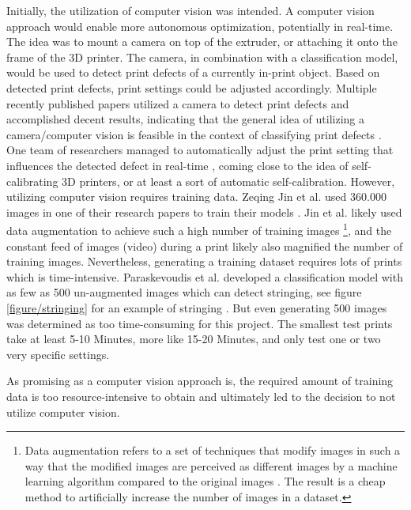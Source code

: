 Initially, the utilization of computer vision was intended. A computer vision approach would enable more autonomous optimization, potentially in real-time. The idea was to mount a camera on top of the extruder, or attaching it onto the frame of the 3D printer. The camera, in combination with a classification model, would be used to detect print defects of a currently in-print object. Based on detected print defects, print settings could be adjusted accordingly. Multiple recently published papers utilized a camera to detect print defects and accomplished decent results, indicating that the general idea of utilizing a camera/computer vision is feasible in the context of classifying print defects \cite{khan2020real, paraskevoudis2020real, jin2020automated, jin2019autonomous}. One team of researchers managed to automatically adjust the print setting that influences the detected defect in real-time \cite{jin2019autonomous}, coming close to the idea of self-calibrating 3D printers, or at least a sort of automatic self-calibration. However, utilizing computer vision requires training data. Zeqing Jin et al. used 360.000 images in one of their research papers to train their models \cite{jin2019autonomous}. Jin et al. likely used data augmentation to achieve such a high number of training images \footnote{Data augmentation refers to a set of techniques that modify images in such a way that the modified images are perceived as different images by a machine learning algorithm compared to the original images \cite{perez2017effectiveness}. The result is a cheap method to artificially increase the number of images in a dataset.}, and the constant feed of images (video) during a print likely also magnified the number of training images. Nevertheless, generating a training dataset requires lots of prints which is time-intensive. Paraskevoudis et al. developed a classification model with as few as 500 un-augmented images which can detect stringing, see figure \ref{figure/stringing} for an example of stringing \cite{paraskevoudis2020real}. But even generating 500 images was determined as too time-consuming for this project. The smallest test prints take at least 5-10 Minutes, more like 15-20 Minutes, and only test one or two very specific settings.

As promising as a computer vision approach is, the required amount of training data is too resource-intensive to obtain and ultimately led to the decision to not utilize computer vision.



